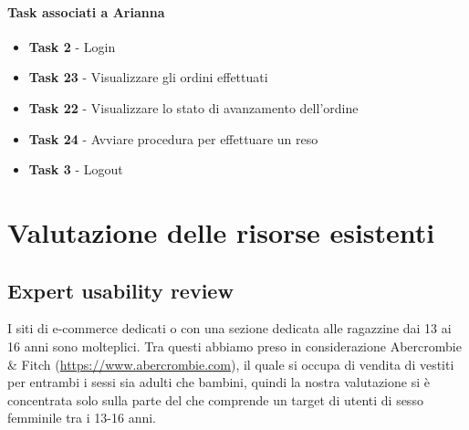 \documentclass[12pt,a4paper]{report}
\begin{document}
\subsubsection*{Task associati a Arianna}
\begin{itemize}
\item \textbf{Task 2} - Login
\item \textbf{Task 23} - Visualizzare gli ordini effettuati
\item \textbf{Task 22} - Visualizzare lo stato di avanzamento dell'ordine
\item \textbf{Task 24} - Avviare procedura per effettuare un reso
\item \textbf{Task 3} - Logout
\end{itemize}
\chapter{Valutazione delle risorse esistenti}
\section{Expert usability review}
I siti di e-commerce dedicati o con una sezione dedicata alle ragazzine dai 13 ai 16 anni sono molteplici. Tra questi abbiamo preso in considerazione Abercrombie \& Fitch (\href{https://www.abercrombie.com}{https://www.abercrombie.com}), il quale si occupa di vendita di vestiti per entrambi i sessi sia adulti che bambini, quindi la nostra valutazione si è concentrata solo sulla parte del che comprende un target di utenti di sesso femminile tra i 13-16 anni.
\end{document}
